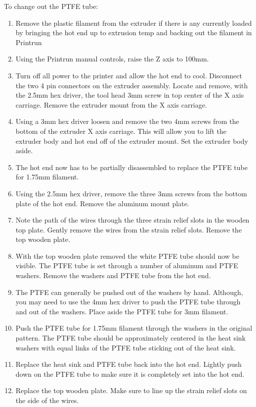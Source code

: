 To change out the PTFE tube:
\begin{enumerate}
\item Remove the plastic filament from the extruder if there is any currently loaded by bringing the hot end up to extrusion temp and backing out the filament in Printrun

\item Using the Printrun manual controls, raise the Z axis to 100mm.
\item Turn off all power to the printer and allow the hot end to cool. Disconnect the two 4 pin connectors on the extruder assembly. Locate and remove, with the 2.5mm hex driver, the tool head 3mm screw in top center of the X axis carriage. Remove the extruder mount from the X axis carriage.
\item Using a 3mm hex driver loosen and remove the two 4mm screws from the bottom of the extruder X axis carriage. This will allow you to lift the extruder body and hot end off of the extruder mount. Set the extruder body aside.
\item The hot end now has to be partially disassembled to replace the PTFE tube for 1.75mm filament. 
\item Using the 2.5mm hex driver, remove the three 3mm screws from the bottom plate of the hot end. Remove the aluminum mount plate.
\item Note the path of the wires through the three strain relief slots in the wooden top plate. Gently remove the wires from the strain relief slots. Remove the top wooden plate.
\item With the top wooden plate removed the white PTFE tube should now be visible. The PTFE tube is set through a number of aluminum and PTFE washers. Remove the washers and PTFE tube from the hot end.
\item The PTFE can generally be pushed out of the washers by hand. Although, you may need to use the 4mm hex driver to push the PTFE tube through and out of the washers. Place aside the PTFE tube for 3mm filament.
\item Push the PTFE tube for 1.75mm filament through the washers in the original pattern. The PTFE tube should be approximately centered in the heat sink washers with equal links of the PTFE tube sticking out of the heat sink.
\item Replace the heat sink and PTFE tube back into the hot end. Lightly push down on the PTFE tube to make sure it is completely set into the hot end.
\item Replace the top wooden plate. Make sure to line up the strain relief slots on the side of the wires.

\end{enumerate}
